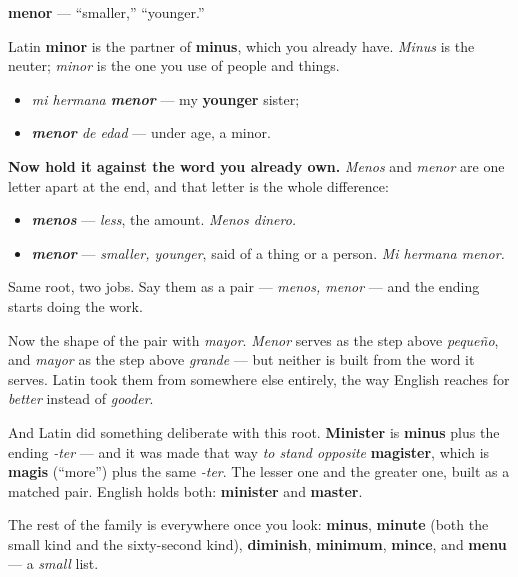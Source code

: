 \begin{cousinweb}
\textbf{menor} — \textquotedblleft{}smaller,\textquotedblright{} \textquotedblleft{}younger.\textquotedblright{}

Latin \textbf{minor} is the partner of \textbf{minus}, which you already have. \emph{Minus} is the neuter; \emph{minor} is the one you use of people and things.

\begin{itemize}
\raggedright
  \item \emph{mi hermana \textbf{menor}} — my \textbf{younger} sister;
  \item \emph{\textbf{menor} de edad} — under age, a minor.
\end{itemize}

\textbf{Now hold it against the word you already own.} \emph{Menos} and \emph{menor} are one letter apart at the end, and that letter is the whole difference:

\begin{itemize}
\raggedright
  \item \emph{\textbf{menos}} — \emph{less}, the amount. \emph{Menos dinero.}
  \item \emph{\textbf{menor}} — \emph{smaller, younger}, said of a thing or a person. \emph{Mi hermana menor.}
\end{itemize}

Same root, two jobs. Say them as a pair — \emph{menos, menor} — and the ending starts doing the work.

Now the shape of the pair with \emph{mayor}. \emph{Menor} serves as the step above \emph{pequeño}, and \emph{mayor} as the step above \emph{grande} — but neither is built from the word it serves. Latin took them from somewhere else entirely, the way English reaches for \emph{better} instead of \emph{gooder}.

And Latin did something deliberate with this root. \textbf{Minister} is \textbf{minus} plus the ending \emph{-ter} — and it was made that way \emph{to stand opposite} \textbf{magister}, which is \textbf{magis} (\textquotedblleft{}more\textquotedblright{}) plus the same \emph{-ter}. The lesser one and the greater one, built as a matched pair. English holds both: \textbf{minister} and \textbf{master}.

The rest of the family is everywhere once you look: \textbf{minus}, \textbf{minute} (both the small kind and the sixty-second kind), \textbf{diminish}, \textbf{minimum}, \textbf{mince}, and \textbf{menu} — a \emph{small} list.
\end{cousinweb}

